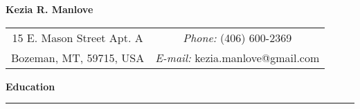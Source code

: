 \documentclass[9pt]{article}
\newenvironment{innerlist}[1][\enskip\textbullet]%
        {\begin{compactitem}[#1]}{\end{compactitem}}
\begin{document}
\sffamily 

\centerline{\textbf{\large{Kezia R. Manlove}}}


\newlength{\rcollength}\setlength{\rcollength}{1.85in}%
%
\begin{center}
\begin{tabular}[t]{c c}

     15 E. Mason Street Apt. A  & \textit{Phone:} (406) 600-2369 \\
			Bozeman, MT,  59715, USA  & \textit{E-mail:} kezia.manlove@gmail.com\\
	
\end{tabular}
\end{center}


\newcommand{\makeheading}[1]%
        {\hspace*{-\marginparsep minus \marginparwidth}%
         \begin{minipage}[t]{\textwidth+\marginparwidth+\marginparsep}%
                {\large \bfseries #1}\\[-0.025\baselineskip]%
                 \rule{\columnwidth}{1.0pt}%
         \end{minipage}} 

\makeheading{Education}
\newenvironment{lonelist}[1][\enskip\textbullet]%
        {\vspace{-\baselineskip}\begin{list}{#1}{%
        \setlength{\partopsep}{-.50pt}%
        \setlength{\topsep}{-.50pt}}}
        {\end{list}\vspace{-.025\baselineskip}}
        

        
\end{document}
